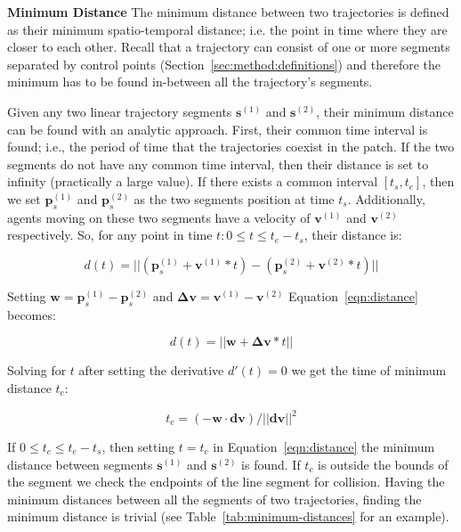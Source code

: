 \textbf{Minimum Distance} The minimum distance between two trajectories is defined as their minimum spatio-temporal distance; i.e. the point in time where they are closer to each other.
Recall that a trajectory can consist of one or more segments separated by control points (Section~\ref{sec:method:definitions}) and therefore the minimum has to be found in-between all the trajectory's segments.

Given any two linear trajectory segments $\mathbf{s}^{(1)}$ and $\mathbf{s}^{(2)}$, their minimum distance can be found with an analytic approach.
First, their common time interval is found; i.e., the period of time that the trajectories coexist in the patch.
If the two segments do not have any common time interval, then their distance is set to infinity (practically a large value).
If there exists a common interval $[t_{s}, t_{e}]$, then we set $\mathbf{p}_s^{(1)}$ and $\mathbf{p}_s^{(2)}$
as the two segments position at time $t_s$.
Additionally, agents moving on these two segments have a velocity of $\mathbf{v}^{(1)}$ and $\mathbf{v}^{(2)}$ respectively.
So, for any point in time $t: 0 \le t \le t_e - t_s$, their distance is:

\begin{equation}
	d(t) = || (\mathbf{p}_s^{(1)}+\mathbf{v}^{(1)} * t) -
				(\mathbf{p}_s^{(2)}+\mathbf{v}^{(2)} * t) ||
	\label{eqn:distance}
\end{equation}

Setting $ \mathbf{w} = \mathbf{p}_s^{(1)} - \mathbf{p}_s^{(2)}$ and $\mathbf{\Delta{v}} = \mathbf{v}^{(1)} - \mathbf{v}^{(2)}$ Equation~\ref{eqn:distance} becomes:

\begin{equation}
	d(t) = || \mathbf{w} + \mathbf{\Delta{v}}*t ||
	\label{eqn:distance_simple}
\end{equation}

Solving for $t$ after setting the derivative $d'(t) = 0$ we get the time of minimum distance $t_c$:

\begin{equation}
	t_c = (-\mathbf{w} \cdot \mathbf{dv}) / || \mathbf{dv} || ^ 2
	\label{eqn:distance_time}
\end{equation}

If $0 \le t_c \le t_e - t_s$, then setting $t = t_c$ in Equation~\ref{eqn:distance} the minimum distance between segments $\mathbf{s}^{(1)}$ and $\mathbf{s}^{(2)}$ is found.
If $t_c$ is outside the bounds of the segment we check the endpoints of the line segment for collision.
Having the minimum distances between all the segments of two trajectories, finding the minimum distance is trivial (see Table~\ref{tab:minimum-distances} for an example).

